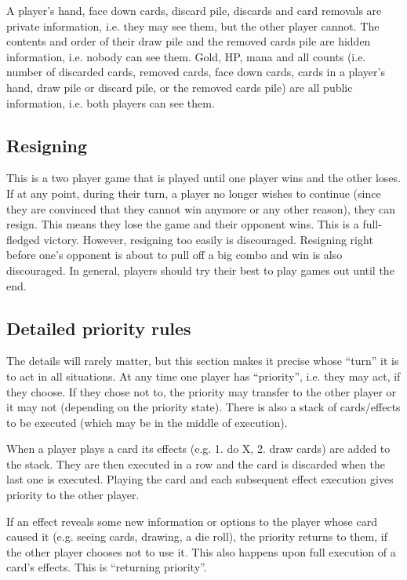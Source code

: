 \documentclass[dvipsnames,parskip,a4paper]{scrartcl}
\begin{document}
A player's hand, face down cards, discard pile, discards and card removals are private information, i.e. they may see them, but the other player cannot. The contents and order of their draw pile and the removed cards pile are hidden information, i.e. nobody can see them. Gold, HP, mana and all counts (i.e. number of discarded cards, removed cards, face down cards, cards in a player's hand, draw pile or discard pile, or the removed cards pile) are all public information, i.e. both players can see them.

\subsection*{Resigning}

This is a two player game that is played until one player wins and the other loses. If at any point, during their turn, a player no longer wishes to continue (since they are convinced that they cannot win anymore or any other reason), they can resign. This means they lose the game and their opponent wins. This is a full-fledged victory. However, resigning too easily is discouraged. Resigning right before one's opponent is about to pull off a big combo and win is also discouraged. In general, players should try their best to play games out until the end.

\subsection*{Detailed priority rules}

The details will rarely matter, but this section makes it precise whose ``turn'' it is to act in all situations. At any time one player has ``priority'', i.e. they may act, if they choose. If they chose not to, the priority may transfer to the other player or it may not (depending on the priority state). There is also a stack of cards/effects to be executed (which may be in the middle of execution).

\vspace{4pt}

When a player plays a card its effects (e.g. 1. do X, 2. draw cards) are added to the stack. They are then executed in a row and the card is discarded when the last one is executed. Playing the card and each subsequent effect execution gives priority to the other player.

\vspace{4pt}

If an effect reveals some new information or options to the player whose card caused it (e.g. seeing cards, drawing, a die roll), the priority returns to them, if the other player chooses not to use it. This also happens upon full execution of a card's effects. This is ``returning priority''.
\end{document}

